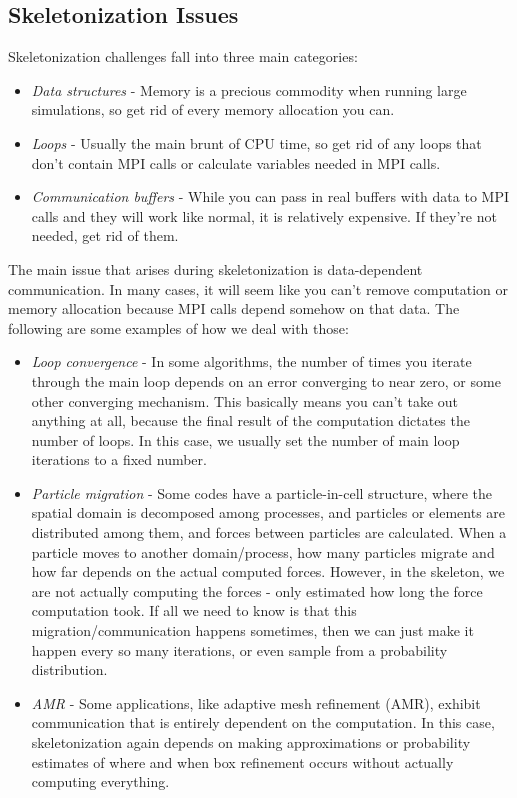 \subsection{Skeletonization Issues}
\label{subsec:skeletonIssues}
Skeletonization challenges fall into three main categories:

\begin{itemize}
\item \textit{Data structures} - Memory is a precious commodity when running large simulations, so get rid of every memory allocation you can.
\item \textit{Loops} - Usually the main brunt of CPU time, so get rid of any loops that don't contain MPI calls or calculate variables needed in MPI calls.
\item \textit{Communication buffers} - While you can pass in real buffers with data to \sstmacro MPI calls and they will work like normal, it is relatively expensive. If they're not needed, get rid of them.
\end{itemize}





The main issue that arises during skeletonization is data-dependent communication.  
In many cases, it will seem like you can't remove computation or memory allocation because MPI calls depend somehow on that data.  
The following are some examples of how we deal with those:

\begin{itemize}
\item \textit{Loop convergence} - In some algorithms, the number of times you iterate through the main loop depends on an error converging to near zero, or some other converging mechanism.  This basically means you can't take out anything at all, because the final result of the computation dictates the number of loops.  In this case, we usually set the number of main loop iterations to a fixed number.  
\item \textit{Particle migration} - Some codes have a particle-in-cell structure, where the spatial domain is decomposed among processes, and particles or elements are distributed among them, and forces between particles are calculated.  When a particle moves to another domain/process, how many particles migrate and how far depends on the actual computed forces. However, in the skeleton, we are not actually computing the forces - only estimated how long the force computation took.  If all we need to know is that this migration/communication happens sometimes, then we can just make it happen every so many iterations, or even sample from a probability distribution.  
\item \textit{AMR} - Some applications, like adaptive mesh refinement (AMR), exhibit communication that is entirely dependent on the computation.  In this case, skeletonization again depends on making approximations or probability estimates of where and when box refinement occurs without actually computing everything.
\end{itemize}

